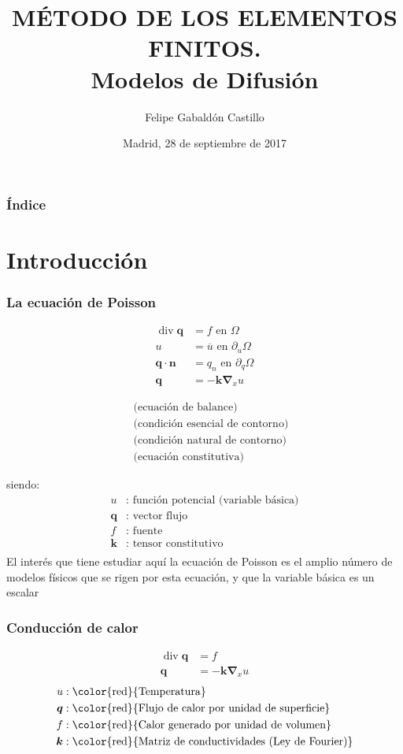 \documentclass[handout]{beamer}
\title[Modelos de difusión]{
	MÉTODO DE LOS ELEMENTOS FINITOS. \\
	Modelos de Difusión}
\author[Felipe Gabaldón]{Felipe Gabaldón Castillo}
\date{Madrid, 28 de septiembre de 2017}
\begin{document}
\begin{frame}
\titlepage
\end{frame}
\begin{frame}
\frametitle{Índice}
\tableofcontents[pausesections]
\end{frame}
\section{Introducción}
\begin{frame}
\frametitle{La ecuación de Poisson}
\parbox{40mm}{
\begin{align*}
\operatorname{div} \bm{q}&=f \textrm{ en }\Omega \\
u&=\overline{u}\textrm{ en } \partial_{u} \Omega \\
\bm{q}\cdot \bm{n}&=q_n \textrm{ en } \partial_{q} \Omega\\
\bm{q}&=-\bm{k} \bm{\nabla}_{x} u
\end{align*}
}
\parbox{50mm}{
\begin{align*}
\mbox{}& \textrm{ (ecuación de balance)} \\
\mbox{}& \textrm{ (condición esencial de contorno)}\\
\mbox{}& \textrm{ (condición natural de contorno)}\\
\mbox{}& \textrm{ (ecuación constitutiva)}
\end{align*}
}
siendo:
\vspace{-5mm}
\begin{align*}
u  &:\textrm{ función potencial (variable básica)} \\
\bm{q}&:\textrm{ vector flujo} \\
f&:\textrm{ fuente} \\
\bm{k}&:\textrm{ tensor constitutivo} \\
\end{align*}
El interés que tiene estudiar aquí la ecuación de Poisson es el
amplio número de modelos físicos que se rigen por esta ecuación, y que
la variable básica es un escalar
\end{frame}
\begin{frame}
\frametitle{Conducción de calor}
\begin{align*}
\operatorname{div} \bm{q}&=f  \\
\bm{q}&=-\bm{k} \bm{\nabla}_{x} u
\end{align*}
\begin{align*}
u  &:\textrm{\color{red}{Temperatura}} \\
\bm{q}&:\textrm{\color{red}{Flujo de calor por unidad de superficie}} \\
f&:\textrm{\color{red}{Calor generado por unidad de volumen}} \\
\bm{k}&:\textrm{\color{red}{Matriz de conductividades (Ley de Fourier)}}
\end{align*}
\end{frame}
\end{document}
